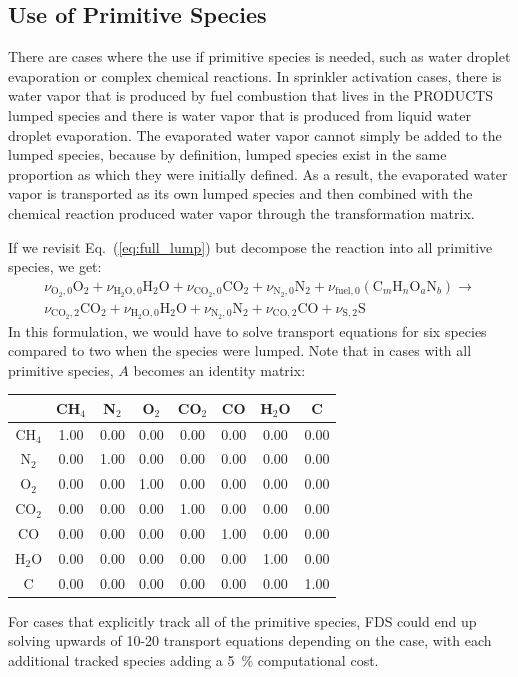 \subsection{Use of Primitive Species}
There are cases where the use if primitive species is needed, such as water droplet evaporation or complex chemical reactions. In sprinkler activation cases, there is water vapor that is produced by fuel combustion that lives in the {\ct PRODUCTS} lumped species and there is water vapor that is produced from liquid water droplet evaporation. The evaporated water vapor cannot simply be added to the lumped species, because by definition, lumped species exist in the same proportion as which they were initially defined. As a result, the evaporated water vapor is transported as its own lumped species and then combined with the chemical reaction produced water vapor through the transformation matrix.   

If we revisit Eq.~(\ref{eq:full_lump}) but decompose the reaction into all primitive species, we get:
\begin{eqnarray}\label{eq:prim}
\nu_{\mathrm{O}_{2},0}\mathrm{O}_2+\nu_{\mathrm{H}_{2}\mathrm{O},0}\mathrm{H}_2\mathrm{O}+\nu_{\mathrm{CO}_{2},0}\mathrm{CO}_2+\nu_{\mathrm{N}_{2},0}\mathrm{N}_2+\nu_{\mathrm{fuel},0}(\mbox{C}_m\mbox{H}_n\mbox{O}_a\mbox{N}_b) \rightarrow \\
\nonumber \nu_{\mathrm{CO}_{2},2}\mathrm{CO}_2+\nu_{\mathrm{H}_{2}\mathrm{O},0}\mathrm{H}_2\mathrm{O}+\nu_{\mathrm{N}_{2},0}\mathrm{N}_2+\nu_{\mathrm{CO},2}\mathrm{CO}+\nu_{\mathrm{S},2}\mathrm{S}
\end{eqnarray}
In this formulation, we would have to solve transport equations for six species compared to two when the species were lumped. Note that in cases with all primitive species, $A$ becomes an identity matrix:

\begin{center}
\begin{tabular}{|c|c|c|c|c|c|c|c|}
\hline  & {CH$_4$} & {N$_2$} & {O$_2$} & {CO$_2$} & {CO} & {H$_2$O} & {C} \\ \hline \hline
{CH$_4$}            & 1.00 & 0.00 & 0.00 & 0.00 & 0.00 & 0.00 & 0.00 \\
{N$_2$}             & 0.00 & 1.00 & 0.00 & 0.00 & 0.00 & 0.00 & 0.00 \\
{O$_2$}             & 0.00 & 0.00 & 1.00 & 0.00 & 0.00 & 0.00 & 0.00 \\
{CO$_2$}            & 0.00 & 0.00 & 0.00 & 1.00 & 0.00 & 0.00 & 0.00 \\
{CO}                & 0.00 & 0.00 & 0.00 & 0.00 & 1.00 & 0.00 & 0.00 \\ 
{H$_2$O}            & 0.00 & 0.00 & 0.00 & 0.00 & 0.00 & 1.00 & 0.00 \\ 
{C}                 & 0.00 & 0.00 & 0.00 & 0.00 & 0.00 & 0.00 & 1.00 \\\hline
\end{tabular}
\end{center}
For cases that explicitly track all of the primitive species, FDS could end up solving upwards of 10-20 transport equations depending on the case, with each additional tracked species adding a 5~\% computational cost.



